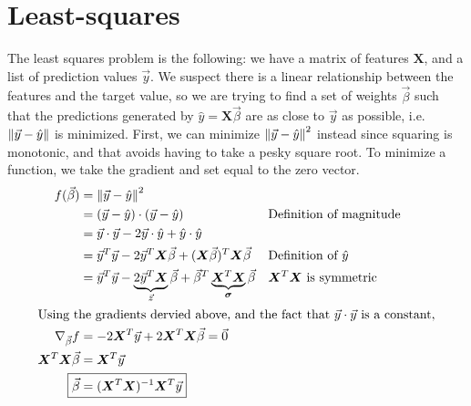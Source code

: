 \documentclass[11pt, oneside]{article}
\begin{document}
\section{Least-squares}
The least squares problem is the following: we have a matrix of features
\( \bm{X} \), and a list of prediction values \( \vec{y} \). We suspect there
is a linear relationship between the features and the target value, so we
are trying to find a set of weights \( \vec{\beta} \) such that the predictions
generated by \( \hat{y} = \bm{X} \vec{\beta} \) are as close to \( \vec{y} \)
as possible, i.e. \( \norm{\vec{y} - \hat{y}} \) is minimized.
First, we can minimize \( \norm{\vec{y} - \hat{y}}^2 \) instead 
since squaring is monotonic, and that avoids having to take a pesky square root.
To minimize a function, we take the gradient and set equal to the zero vector.
\begin{align*}
  f(\vec{\beta}) &= \norm{\vec{y} - \hat{y}}^2 \\
                 &= (\vec{y} - \hat{y}) \cdot (\vec{y} - \hat{y}) && \text{Definition of magnitude} \\
                 &= \vec{y} \cdot \vec{y} - 2 \vec{y} \cdot \hat{y} + \hat{y} \cdot \hat{y} \\
                 &= \vec{y}^T \vec{y} - 2 \vec{y}^T \bm{X} \vec{\beta} + (\bm{X} \vec{\beta})^T \bm{X} \vec{\beta} &&
                 \text{Definition of \( \hat{y} \)} \\
                 &= \vec{y}^T \vec{y} - \underbrace{2 \vec{y}^T \bm{X}}_{\vec{z}} \vec{\beta} 
  + \vec{\beta}^T \underbrace{\bm{X}^T \bm{X}}_{\bm{\sigma}} \vec{\beta} &&
  \text{\( \bm{X}^T \bm{X} \) is symmetric} \\
  \shortintertext{Using the gradients dervied above, and the fact that
  \( \vec{y} \cdot \vec{y} \) is a constant,}
  \nabla_{\vec{\beta}} f &= -2 \bm{X}^T \vec{y} + 2 \bm{X}^T \bm{X} \vec{\beta} = \vec{0} \\
  \bm{X}^T \bm{X} \vec{\beta} &= \bm{X}^T \vec{y} \\
  \Aboxed{\vec{\beta} &= (\bm{X}^T \bm{X})^{-1} \bm{X}^T \vec{y}} 
\end{align*}

\end{document}
